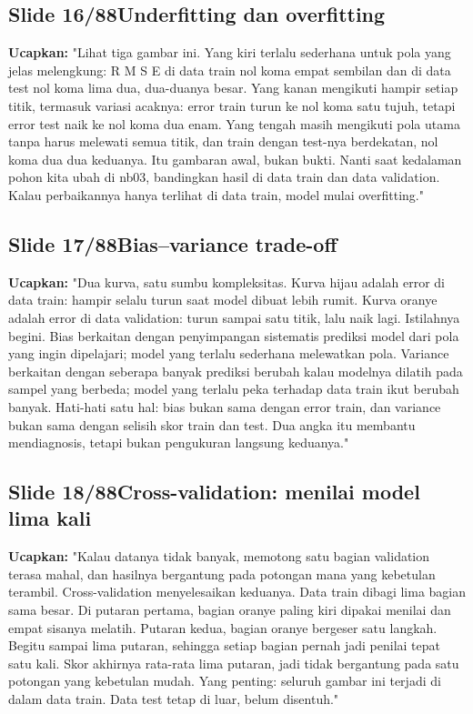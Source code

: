 \documentclass[11pt]{article}
\renewcommand{\framebox}[1]{\colorbox{acc!15}{\textcolor{acc}{\textbf{#1}}}}
\begin{document}
\subsection*{\framebox{Slide 16/88}\quad Underfitting dan overfitting}
\textbf{Ucapkan:} "Lihat tiga gambar ini. Yang kiri terlalu sederhana untuk pola yang jelas melengkung: R M S E di data train nol koma empat sembilan dan di data test nol koma lima dua, dua-duanya besar. Yang kanan mengikuti hampir setiap titik, termasuk variasi acaknya: error train turun ke nol koma satu tujuh, tetapi error test naik ke nol koma dua enam. Yang tengah masih mengikuti pola utama tanpa harus melewati semua titik, dan train dengan test-nya berdekatan, nol koma dua dua keduanya. Itu gambaran awal, bukan bukti. Nanti saat kedalaman pohon kita ubah di nb03, bandingkan hasil di data train dan data validation. Kalau perbaikannya hanya terlihat di data train, model mulai overfitting."\\[2pt]

\subsection*{\framebox{Slide 17/88}\quad Bias--variance trade-off}
\textbf{Ucapkan:} "Dua kurva, satu sumbu kompleksitas. Kurva hijau adalah error di data train: hampir selalu turun saat model dibuat lebih rumit. Kurva oranye adalah error di data validation: turun sampai satu titik, lalu naik lagi. Istilahnya begini. Bias berkaitan dengan penyimpangan sistematis prediksi model dari pola yang ingin dipelajari; model yang terlalu sederhana melewatkan pola. Variance berkaitan dengan seberapa banyak prediksi berubah kalau modelnya dilatih pada sampel yang berbeda; model yang terlalu peka terhadap data train ikut berubah banyak. Hati-hati satu hal: bias bukan sama dengan error train, dan variance bukan sama dengan selisih skor train dan test. Dua angka itu membantu mendiagnosis, tetapi bukan pengukuran langsung keduanya."\\[2pt]

\subsection*{\framebox{Slide 18/88}\quad Cross-validation: menilai model lima kali}
\textbf{Ucapkan:} "Kalau datanya tidak banyak, memotong satu bagian validation terasa mahal, dan hasilnya bergantung pada potongan mana yang kebetulan terambil. Cross-validation menyelesaikan keduanya. Data train dibagi lima bagian sama besar. Di putaran pertama, bagian oranye paling kiri dipakai menilai dan empat sisanya melatih. Putaran kedua, bagian oranye bergeser satu langkah. Begitu sampai lima putaran, sehingga setiap bagian pernah jadi penilai tepat satu kali. Skor akhirnya rata-rata lima putaran, jadi tidak bergantung pada satu potongan yang kebetulan mudah. Yang penting: seluruh gambar ini terjadi di dalam data train. Data test tetap di luar, belum disentuh."\\[2pt]
\end{document}
